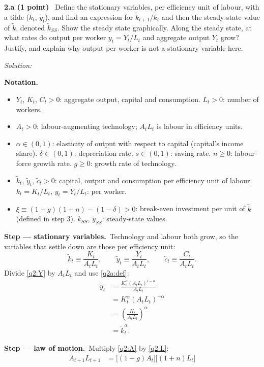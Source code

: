 \documentclass[11pt,a4paper]{article}
\newif\ifsolucoes
\newcommand{\sub}[2]{\Needspace{8\baselineskip}\par\medskip\noindent\textbf{#1 (#2)}~}
\newcommand{\resolespaco}[1][6cm]{\ifsolucoes\else\par\textit{Solution:}\vspace{#1}\par\fi}
\newcommand{\passo}[2]{\par\smallskip\noindent\textbf{Step --- #1.}~#2}
\newenvironment{notacao}{\par\smallskip\noindent\textbf{Notation.}\begin{itemize}[leftmargin=1.4em,topsep=1pt,itemsep=0pt]\small}{\end{itemize}}
\begin{document}
\sub{2.a}{1 point} Define the stationary variables, per efficiency unit of labour, with a tilde
($\tilde k_t$, $\tilde y_t$), and find an expression for $\tilde k_{t+1}/\tilde k_t$ and then the
steady-state value of $\tilde k$, denoted $\tilde k_{SS}$. Show the steady state graphically. Along
the steady state, at what rates do output per worker $y_t=Y_t/L_t$ and aggregate output $Y_t$ grow?
Justify, and explain why output per worker is not a stationary variable here.
\resolespaco[7cm]
\begin{sol}
\begin{notacao}
\item $Y_t$, $K_t$, $C_t>0$: aggregate output, capital and consumption. $L_t>0$: number of workers.
\item $A_t>0$: labour-augmenting technology; $A_tL_t$ is labour in efficiency units.
\item $\alpha\in(0,1)$: elasticity of output with respect to capital (capital's income share).
$\delta\in(0,1)$: depreciation rate. $s\in(0,1)$: saving rate. $n\ge0$: labour-force growth rate.
$g\ge0$: growth rate of technology.
\item $\tilde k_t$, $\tilde y_t$, $\tilde c_t>0$: capital, output and consumption per efficiency unit
of labour. $k_t=K_t/L_t$, $y_t=Y_t/L_t$: per worker.
\item $\xi\equiv(1+g)(1+n)-(1-\delta)>0$: break-even investment per unit of $\tilde k$ (defined in
step 3). $\tilde k_{SS}$, $\tilde y_{SS}$: steady-state values.
\end{notacao}
\passo{stationary variables}{Technology and labour both grow, so the variables that settle down are
those per efficiency unit:}
\begin{equation}
\tilde k_t\equiv\frac{K_t}{A_tL_t},\qquad \tilde y_t\equiv\frac{Y_t}{A_tL_t},\qquad
\tilde c_t\equiv\frac{C_t}{A_tL_t}. \label{q2a:def}
\end{equation}
Divide \eqref{q2:Y} by $A_tL_t$ and use \eqref{q2a:def}:
\begin{align}
\tilde y_t &= \frac{K_t^{\alpha}(A_tL_t)^{1-\alpha}}{A_tL_t}\nonumber\\
&= K_t^{\alpha}(A_tL_t)^{-\alpha}\nonumber\\
&= \left(\frac{K_t}{A_tL_t}\right)^{\alpha}\nonumber\\
&= \tilde k_t^{\alpha}. \label{q2a:y}
\end{align}
\passo{law of motion}{Multiply \eqref{q2:A} by \eqref{q2:L}:}
\begin{align}
A_{t+1}L_{t+1} &= \big[(1+g)A_t\big]\big[(1+n)L_t\big]\nonumber\\

\end{align}
\end{sol}
\end{document}
